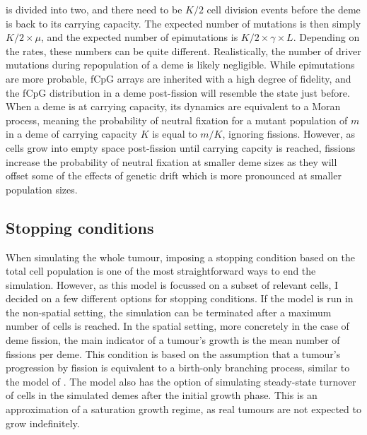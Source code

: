 is divided into two, and there need to be $K/2$ cell division events before the
deme is back to its carrying capacity. The expected number of mutations is then
simply $K/2\times\mu$, and the expected number of epimutations is
$K/2\times\gamma\times L$. Depending on the rates, these numbers can be quite
different. Realistically, the number of driver mutations during repopulation of
a deme is likely negligible. While epimutations are more probable, fCpG arrays
are inherited with a high degree of fidelity, and the fCpG distribution in a
deme post-fission will resemble the state just before. When a deme is at
carrying capacity, its dynamics are equivalent to a Moran process, meaning the
probability of neutral fixation for a mutant population of $m$ in a deme of
carrying capacity $K$ is equal to $m/K$, ignoring fissions. However, as cells
grow into empty space post-fission until carrying capcity is reached, fissions
increase the probability of neutral fixation at smaller deme sizes as they will
offset some of the effects of genetic drift which is more pronounced at smaller
population sizes.

\subsection{Stopping conditions}
When simulating the whole tumour, imposing a stopping condition based on the
total cell population is one of the most straightforward ways to end the
simulation. However, as this model is focussed on a subset of relevant cells, I
decided on a few different options for stopping conditions. If the model is run
in the non-spatial setting, the simulation can be terminated after a maximum
number of cells is reached. In the spatial setting, more concretely in the case
of deme fission, the main indicator of a tumour's growth is the mean number of
fissions per deme. This condition is based on the assumption that a tumour's
progression by fission is equivalent to a birth-only branching process, similar
to the model of \cite{sottoriva_big_2015}. The model also has the option of
simulating steady-state turnover of cells in the simulated demes after the
initial growth phase. This is an approximation of a saturation growth regime,
as real tumours are not expected to grow indefinitely.

